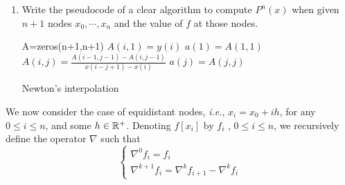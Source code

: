 \begin{enumerate}
	\begin{proof}
	We prove by induction.
	For \(n=1\), we have proved in the previous step that 
	\[ f[x_0,x_1]=\frac{f(x_1)-f(x_0)}{x_1-x_0} \]
	Suppose this is true for \(k=n\), then according to the previous result, we have the interpolating polynomial with degree at most $n$ passing \((x_0,f(x_0)),(x_1,f(x_1)),\cdots,\\ (x_{n},f(x_{n}))\)
	\[ P_1^n(x)=f(x_0)+\sum_{j=1}^{n} f[x_0,\cdots, x_j] \prod_{k=0}^{j-1}(x-x_k) \]
	When \(k=n+1\), we also have another polynomial of degree at most $n$ interpolating \((x_1,f(x_1)),(x_2,f(x_2)), \cdots, (x_{n+1},f(x_{n+1}))\)
	\[ P_2^n(x)=f(x_1)+\sum_{j=2}^{n+1} f[x_1,\cdots, x_j] \prod_{k=1}^{j}(x-x_k) \]
	We can express \(P^{n+1}(x)\) by these two interpolating polynomials
	\[ P^{n+1}(x)=\frac{x-x_0}{x_{n+1}-x_0}P_2^n(x)+\frac{x_{n+1}-x}{x_{n+1}-x_0}P_1^n(x) \]
	This is constructed to satisfy
	\[ P^{n+1}(x_i)=\begin{cases}P_1^n(x_0)=f(x_0) & i=0 \\ f(x_i) & i=1,\cdots,n \\ P_2^n(x)=f(x_{n+1}) & i=n+1 \end{cases} \]
	So this is indeed the interpolating polynomial of these $n+2$ points.
	And the coefficient of \(x^{n+1}\) is
	\[ \frac{f[x_1,\cdots, x_{n+1}]-f[x_0,\cdots, x_n]}{x_{n+1}-x_0} \]
	By the principle of mathematical induction, we have it true for all \(k\in\N^*\).
	\end{proof}
	\item Write the pseudocode of a clear algorithm to compute \(P^n(x)\) when given $n+1$ nodes \(x_0,\cdots,x_n\) and the value of $f$ at those nodes.
	\begin{algorithm}[ht]
	A=zeros(n+1,n+1)\;
	{
		\(A(i,1)=y(i)\)\;
	}
	\(a(1)=A(1,1)\)\;
	{
		{
			\(A(i,j)=\frac{A(i-1,j-1)-A(i,j-1)}{x(i-j+1)-x(i)}\)\;
		}
		\(a(j)=A(j,j)\)\;
	}
	\caption{Newton's interpolation}
	\end{algorithm}
\end{enumerate}

We now consider the case of equidistant nodes, \textit{i.e.}, \(x_i = x_0 + ih\), for any \(0\leq i\leq n\), and some \(h\in\mathbb{R}^+\).
Denoting \(f[x_i]\) by $f_i$ , \(0\leq i\leq n\), we recursively define the operator $\nabla$ such that
\[ \begin{cases} \nabla^0 f_i=f_i \\ \nabla^{k+1}f_i=\nabla^{k}f_{i+1}-\nabla^{k}f_{i} \end{cases} \]

